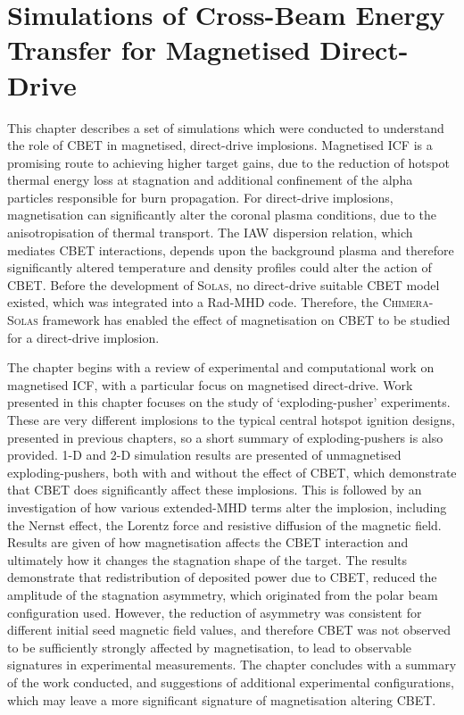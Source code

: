 \chapter{Simulations of Cross-Beam Energy Transfer for Magnetised Direct-Drive}

This chapter describes a set of simulations which were conducted to understand the role of \ac{CBET} in magnetised, direct-drive implosions.
Magnetised \ac{ICF} is a promising route to achieving higher target gains, due to the reduction of hotspot thermal energy loss at stagnation and additional confinement of the alpha particles responsible for burn propagation.
For direct-drive implosions, magnetisation can significantly alter the coronal plasma conditions, due to the anisotropisation of thermal transport.
The \ac{IAW} dispersion relation, which mediates \ac{CBET} interactions, depends upon the background plasma and therefore significantly altered temperature and density profiles could alter the action of \ac{CBET}.
Before the development of \textsc{Solas}, no direct-drive suitable \ac{CBET} model existed, which was integrated into a \ac{Rad-MHD} code.
Therefore, the \textsc{Chimera}-\textsc{Solas} framework has enabled the effect of magnetisation on \ac{CBET} to be studied for a direct-drive implosion.

The chapter begins with a review of experimental and computational work on magnetised \ac{ICF}, with a particular focus on magnetised direct-drive.
Work presented in this chapter focuses on the study of `exploding-pusher' experiments.
These are very different implosions to the typical central hotspot ignition designs, presented in previous chapters, so a short summary of exploding-pushers is also provided.
1-D and 2-D simulation results are presented of unmagnetised exploding-pushers, both with and without the effect of \ac{CBET}, which demonstrate that \ac{CBET} does significantly affect these implosions.
This is followed by an investigation of how various extended-\ac{MHD} terms alter the implosion, including the Nernst effect, the Lorentz force and resistive diffusion of the magnetic field.
Results are given of how magnetisation affects the \ac{CBET} interaction and ultimately how it changes the stagnation shape of the target.
The results demonstrate that redistribution of deposited power due to \ac{CBET}, reduced the amplitude of the stagnation asymmetry, which originated from the polar beam configuration used.
However, the reduction of asymmetry was consistent for different initial seed magnetic field values, and therefore \ac{CBET} was not observed to be sufficiently strongly affected by magnetisation, to lead to observable signatures in experimental measurements.
The chapter concludes with a summary of the work conducted, and suggestions of additional experimental configurations, which may leave a more significant signature of magnetisation altering \ac{CBET}.

